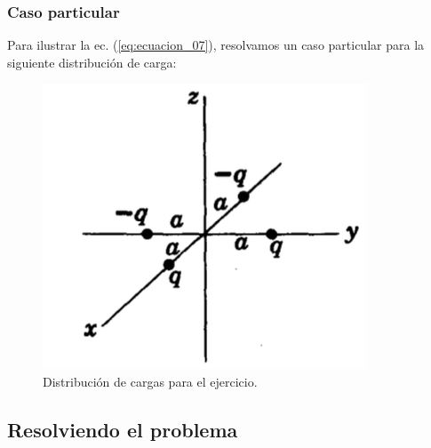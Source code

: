 \documentclass[12pt]{beamer}
\begin{document}
\begin{frame}
\frametitle{Caso particular}
Para ilustrar la ec. (\ref{eq:ecuacion_07}), resolvamos un caso particular para la siguiente distribución de carga:
\begin{figure}[H]
    \centering
    \includegraphics[scale=0.4]{Imagenes/Desarrollo_multipolar_4_cargas.png}
    \caption{Distribución de cargas para el ejercicio.}
    \label{fig:figura_02}
\end{figure}
\end{frame}

\subsection{Resolviendo el problema}
\end{document}
